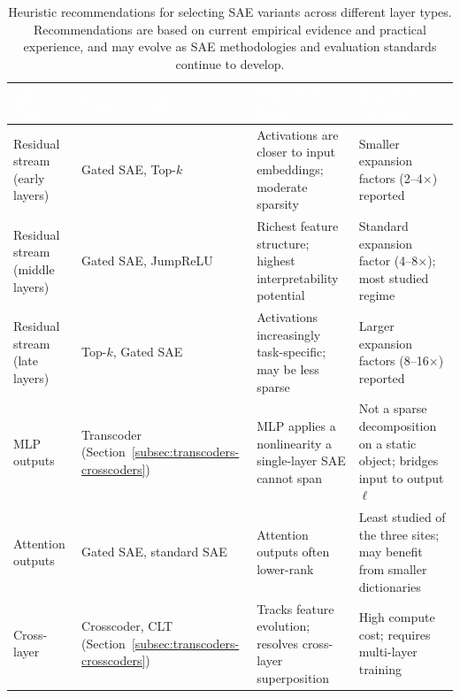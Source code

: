\begin{table}[tb]
\centering
\caption{Heuristic recommendations for selecting SAE variants across different layer types. Recommendations are based on current empirical evidence and practical experience, and may evolve as SAE methodologies and evaluation standards continue to develop.}
\label{tab:sae-layer-recommendations}
\renewcommand{\arraystretch}{1.3}
\begin{tabular}{>{\raggedright\arraybackslash}p{2.8cm} >{\raggedright\arraybackslash}p{3.2cm} >{\raggedright\arraybackslash}p{4cm} >{\raggedright\arraybackslash}p{4cm}}
\toprule
\rowcolor{tableheader!80} \textcolor{white}{\textbf{Layer Type}} & \textcolor{white}{\textbf{Variants Used}} & \textcolor{white}{\textbf{Reported Basis}} & \textcolor{white}{\textbf{Reported Caveats}} \\
\midrule
\rowcolor{tablerow1} Residual stream (early layers) & Gated SAE, Top-$k$ & Activations are closer to input embeddings; moderate sparsity & Smaller expansion factors (2--4$\times$) reported \\
\rowcolor{tablerow2} Residual stream (middle layers) & Gated SAE, JumpReLU & Richest feature structure; highest interpretability potential & Standard expansion factor (4--8$\times$); most studied regime \\
\rowcolor{tablerow1} Residual stream (late layers) & Top-$k$, Gated SAE & Activations increasingly task-specific; may be less sparse & Larger expansion factors (8--16$\times$) reported \\
\rowcolor{tablerow2} MLP outputs & Transcoder (Section~\ref{subsec:transcoders-crosscoders}) & MLP applies a nonlinearity a single-layer SAE cannot span & Not a sparse decomposition on a static object; bridges input to output $\ell$ \\
\rowcolor{tablerow1} Attention outputs & Gated SAE, standard SAE & Attention outputs often lower-rank & Least studied of the three sites; may benefit from smaller dictionaries \\
\rowcolor{tablerow2} Cross-layer & Crosscoder, CLT (Section~\ref{subsec:transcoders-crosscoders}) & Tracks feature evolution; resolves cross-layer superposition & High compute cost; requires multi-layer training \\
\bottomrule
\end{tabular}
\end{table}


